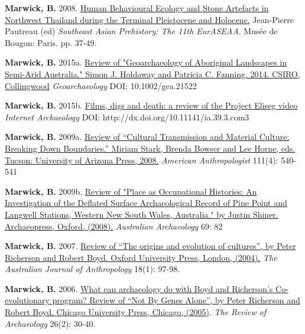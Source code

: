 \documentclass[11pt,article,oneside]{memoir}
\begin{document}
{{{{\ind \textbf{Marwick, B.} 2008. \href{http://faculty.washington.edu/bmarwick/PDFs/Marwick_2008_EurASEAA.pdf}{Human Behavioural Ecology and Stone Artefacts in Northwest Thailand during the Terminal Pleistocene and Holocene.} Jean-Pierre Pautreau (ed) \textit{Southeast Asian Prehistory: The 11th EurASEAA}. Musée de Bougon: Paris. pp. 37-49.

\bigskip


\ind \textbf{Marwick, B.} 2015a. \href{https://www.academia.edu/15214960/Review_of_Geoarchaeology_of_Aboriginal_Landscapes_in_Semi-Arid_Australia._Simon_J._Holdaway_and_Patricia_C._Fanning._2014._CSIRO_Collingwood._Geoarchaeology_Article_first_published_online_26_AUG_2015_DOI_10.1002_gea.21522}{Review of "Geoarchaeology of Aboriginal Landscapes in Semi-Arid Australia." Simon J. Holdaway and Patricia C. Fanning. 2014. CSIRO, Collingwood} \textit{Geoarchaeology}  DOI: 10.1002/gea.21522

\ind \textbf{Marwick, B.} 2015b. \href{http://intarch.ac.uk/journal/issue39/3/comms.cfm#tabs-3}{Films, digs and death: a review of the Project Eliseg video} \textit{Internet Archaeology} DOI: http://dx.doi.org/10.11141/ia.39.3.com3

\ind \textbf{Marwick, B.} 2009a. \href{http://faculty.washington.edu/bmarwick/PDFs/Marwick_2009_AA_Stark_Review.pdf}{Review of “Cultural Transmission and Material Culture: Breaking Down Boundaries.” Miriam Stark, Brenda Bowser and Lee Horne, eds. Tucson: University of Arizona Press, 2008.} \textit{American Anthropologist} 111(4): 540-541

\ind \textbf{Marwick, B.} 2009b. \href{http://faculty.washington.edu/bmarwick/PDFs/Marwick_2009_Shiner_review.pdf}{Review of "Place as Occupational Histories: An Investigation of the Deflated Surface Archaeological Record of Pine Point and Langwell Stations, Western New South Wales, Australia." by Justin Shiner. Archaeopress, Oxford, (2008).} \textit{Australian Archaeology} 69: 82

\ind \textbf{Marwick, B.} 2007. \href{http://faculty.washington.edu/bmarwick/PDFs/Evolution.pdf}{Review of “The origins and evolution of cultures”, by Peter Richerson and Robert Boyd. Oxford University Press, London, (2004).} \textit{The Australian Journal of Anthropology} 18(1): 97-98.

\ind \textbf{Marwick, B.} 2006. \href{http://faculty.washington.edu/bmarwick/PDFs/Marwick_2006_[B&R].pdf}{What can archaeology do with Boyd and Richerson’s Co-evolutionary program? Review of “Not By Genes Alone”, by Peter Richerson and Robert Boyd. Chicago University Press, Chicago, (2005)}. \textit{The Review of Archaeology} 26(2): 30-40.

}}}}
\end{document}

